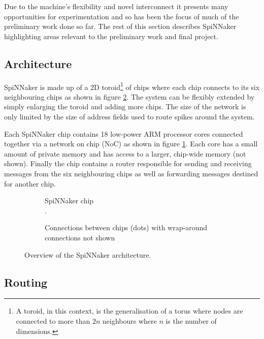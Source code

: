 		Due to the machine's flexibility and novel interconnect it presents many
		opportunities for experimentation and so has been the focus of much of the
		preliminary work done so far. The rest of this section describes SpiNNaker
		highlighting areas relevant to the preliminary work and final project.
		
		\subsection{Architecture}
			
			SpiNNaker is made up of a 2D toroid\footnote{A toroid, in this context, is
			the generalisation of a torus where nodes are connected to more than $2n$
			neighbours where $n$ is the number of dimensions.} of chips where each
			chip connects to its six neighbouring chips as shown in figure
			\ref{fig:spinnaker-chips}. The system can be flexibly extended by simply
			enlarging the toroid and adding more chips. The size of the network is
			only limited by the size of address fields used to route spikes around the
			system.
			
			Each SpiNNaker chip contains 18 low-power ARM processor cores connected
			together via a network on chip (NoC) as shown in figure
			\ref{fig:spinnaker-chip}. Each core has a small amount of private memory
			and has access to a larger, chip-wide memory (not shown). Finally the chip
			contains a router responsible for sending and receiving messages from the
			six neighbouring chips as well as forwarding messages destined for another
			chip.
			
			\begin{figure}
				\center
				\begin{subfigure}[b]{0.49\textwidth}
					\center
					
					\caption{SpiNNaker chip\\\color{white}.}
					\label{fig:spinnaker-chip}
				\end{subfigure}
				\begin{subfigure}[b]{0.49\textwidth}
					\center
					
					\caption{Connections between chips (dots) with wrap-around
					connections not shown}
					\label{fig:spinnaker-chips}
				\end{subfigure}
				
				\caption{Overview of the SpiNNaker architecture.}
				\label{fig:spinnaker-architecture}
			\end{figure}
		
		\subsection{Routing}
			
